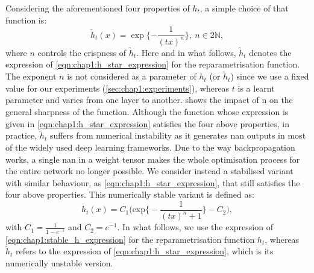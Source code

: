 Considering the aforementioned four properties of $h_t$, a simple choice of that
function is:
\begin{equation}
  \label{eqn:chap1:h_star_expression}
  \tilde{h}_t(x) = \exp\bigg\{{-\displaystyle\frac{1}{(tx)^n}}\bigg\}, ~ n\in 2\mathds{N},
\end{equation}
\noindent where $n$ controls the crispness of $\tilde{h}_t$. Here and in what
follows, $\tilde{h}_t$ denotes the expression of
\cref{eqn:chap1:h_star_expression} for the reparametrisation function. The
exponent $n$ is not considered as a parameter of $h_t$ (or $\tilde{h}_t$) since
we use a fixed value for our experiments (\cref{sec:chap1:experiments}), whereas
$t$ is a learnt parameter and varies from one layer to another.
 shows the impact of n on the general
sharpness of the function. Although the function whose expression is given in
\cref{eqn:chap1:h_star_expression} satisfies the four above properties, in
practice, $\tilde{h}_t$ suffers from numerical instability as it generates
\ac{nan} outputs in most of the widely used deep learning frameworks. Due to the
way backpropagation works, a single \ac{nan} in a weight tensor makes the whole
optimisation process for the entire network no longer possible. We consider
instead a stabilised variant with similar behaviour, as
\cref{eqn:chap1:h_star_expression},  that still satisfies the four above
properties. This numerically stable variant is defined as:
\begin{equation}
  \label{eqn:chap1:stable_h_expression}
  h_t(x) = C_1 \biggl( \text{exp} \bigg\{-\displaystyle\frac{1}{(tx)^n +1}\bigg\} - C_2 \biggr),
\end{equation}
\noindent with $C_1=\frac{1}{1-e^{-1}}$ and $C_2 = e^{-1}$. In what follows, we
use the expression of \cref{eqn:chap1:stable_h_expression} for the
reparametrisation function $h_t$, whereas $\tilde{h}_t$ refers to the expression
of \cref{eqn:chap1:h_star_expression}, which is its numerically unstable
version.\\

